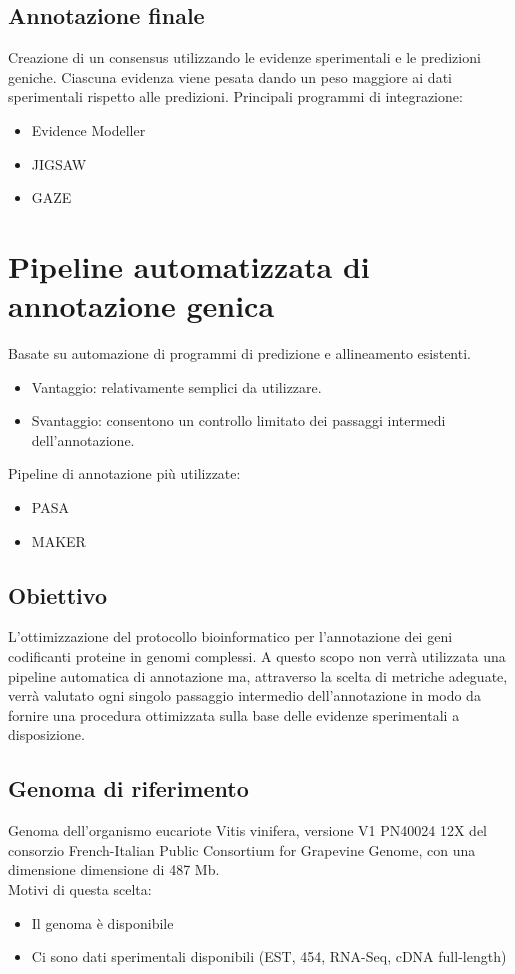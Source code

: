 \documentclass{article}
\begin{document}
\subsection{Annotazione finale}
Creazione di un consensus utilizzando le evidenze sperimentali e le predizioni geniche.
Ciascuna evidenza viene pesata dando un peso maggiore ai
dati sperimentali rispetto alle predizioni.
Principali programmi
di integrazione:
\begin{itemize}
    \item Evidence Modeller
    \item JIGSAW
    \item GAZE
\end{itemize}

\section{Pipeline automatizzata di annotazione genica}
Basate su automazione di programmi di predizione e
allineamento esistenti.
\begin{itemize}
    \item Vantaggio: relativamente semplici da utilizzare.
    \item Svantaggio: consentono un controllo limitato dei passaggi
    intermedi dell'annotazione.
\end{itemize}
Pipeline di annotazione più utilizzate:
\begin{itemize}
    \item PASA 
    \item MAKER 
\end{itemize}
\subsection{Obiettivo}
L'ottimizzazione del protocollo bioinformatico
per l'annotazione dei geni codificanti proteine
in genomi complessi. A questo scopo non verrà utilizzata una
pipeline automatica di annotazione ma,
attraverso la scelta di metriche adeguate,
verrà valutato ogni singolo passaggio
intermedio dell'annotazione in modo da
fornire una procedura ottimizzata sulla base
delle evidenze sperimentali a disposizione.

\subsection{Genoma di riferimento}
Genoma dell'organismo eucariote Vitis
vinifera, versione V1 PN40024 12X del
consorzio French-Italian Public
Consortium for Grapevine Genome, con
una dimensione dimensione di 487 Mb.\\
Motivi di questa scelta:
\begin{itemize}
    \item Il genoma è disponibile
    \item Ci sono dati sperimentali disponibili
    (EST, 454, RNA-Seq, cDNA full-length)
\end{itemize}
\end{document}
